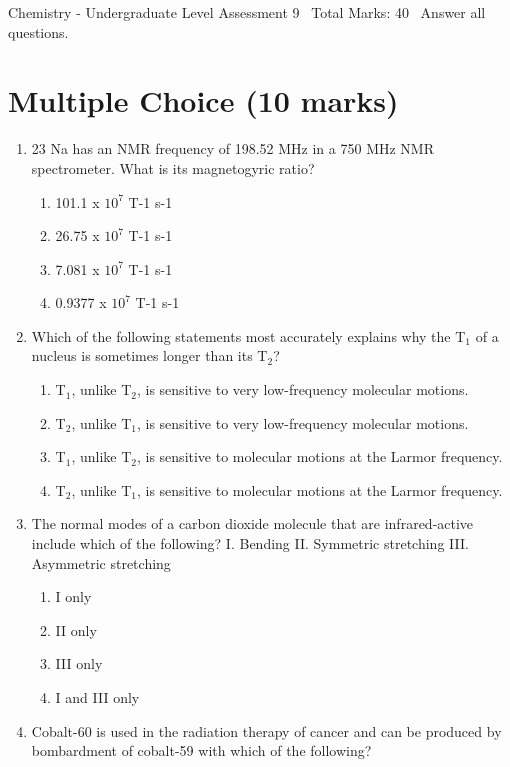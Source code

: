 \documentclass[12pt]{article}
\begin{document}
\begin{center}
Chemistry - Undergraduate Level Assessment 9 \
Total Marks: 40 \
Answer all questions.
\end{center}

\section*{Multiple Choice (10 marks)}
\begin{enumerate}[label=\arabic*.]
\item 23 Na has an NMR frequency of 198.52 MHz in a 750 MHz NMR spectrometer. What is its magnetogyric ratio?
\begin{enumerate}[label=(\alph*)]
    \item 101.1 x $10^7$ T-1 s-1
    \item 26.75 x $10^7$ T-1 s-1
    \item 7.081 x $10^7$ T-1 s-1
    \item 0.9377 x $10^7$ T-1 s-1
\end{enumerate}
\item Which of the following statements most accurately explains why the T$_{1}$ of a nucleus is sometimes longer than its T$_{2}$?
\begin{enumerate}[label=(\alph*)]
    \item T$_{1}$, unlike T$_{2}$, is sensitive to very low-frequency molecular motions.
    \item T$_{2}$, unlike T$_{1}$, is sensitive to very low-frequency molecular motions.
    \item T$_{1}$, unlike T$_{2}$, is sensitive to molecular motions at the Larmor frequency.
    \item T$_{2}$, unlike T$_{1}$, is sensitive to molecular motions at the Larmor frequency.
\end{enumerate}
\item The normal modes of a carbon dioxide molecule that are infrared-active include which of the following? I. Bending II. Symmetric stretching III. Asymmetric stretching
\begin{enumerate}[label=(\alph*)]
    \item I only
    \item II only
    \item III only
    \item I and III only
\end{enumerate}
\item Cobalt-60 is used in the radiation therapy of cancer and can be produced by bombardment of cobalt-59 with which of the following?

\end{enumerate}
\end{document}
